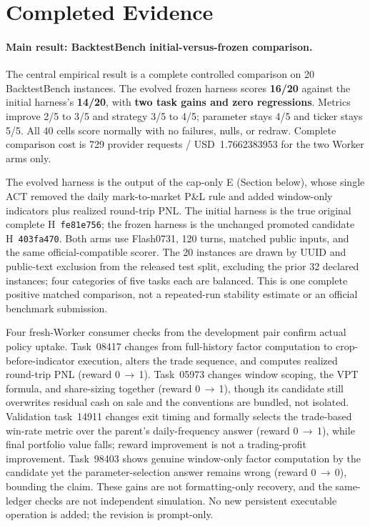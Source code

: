 \section{Completed Evidence}
\label{sec:current-results}

\paragraph{Main result: BacktestBench initial-versus-frozen comparison.}
The central empirical result is a complete controlled comparison on 20
BacktestBench instances.  The evolved frozen harness scores \textbf{16/20}
against the initial harness's \textbf{14/20}, with \textbf{two task gains
and zero regressions}.  Metrics improve 2/5 to 3/5 and strategy 3/5 to 4/5;
parameter stays 4/5 and ticker stays 5/5.  All 40 cells score normally with
no failures, nulls, or redraw.  Complete comparison cost is 729 provider
requests / USD~1.7662383953 for the two Worker arms only.

The evolved harness is the output of the cap-only E (Section below), whose
single ACT removed the daily mark-to-market P\&L rule and added window-only
indicators plus realized round-trip PNL.  The initial harness is the true
original complete H~\texttt{fe81e756}; the frozen harness is the unchanged
promoted candidate H~\texttt{403fa470}.  Both arms use Flash0731, 120 turns,
matched public inputs, and the same official-compatible scorer.  The 20
instances are drawn by UUID and public-text exclusion from the released test
split, excluding the prior 32 declared instances; four categories of five
tasks each are balanced.  This is one complete positive matched comparison,
not a repeated-run stability estimate or an official benchmark submission.

Four fresh-Worker consumer checks from the development pair confirm actual
policy uptake.  Task~08417 changes from full-history factor computation to
crop-before-indicator execution, alters the trade sequence, and computes
realized round-trip PNL (reward 0\,$\to$\,1).  Task~05973 changes window
scoping, the VPT formula, and share-sizing together (reward 0\,$\to$\,1),
though its candidate still overwrites residual cash on sale and the
conventions are bundled, not isolated.  Validation task~14911 changes
exit timing and formally selects the trade-based win-rate metric over the
parent's daily-frequency answer (reward 0\,$\to$\,1), while final portfolio
value falls; reward improvement is not a trading-profit improvement.
Task~98403 shows genuine window-only factor computation by the candidate yet
the parameter-selection answer remains wrong (reward 0\,$\to$\,0), bounding
the claim.  These gains are not formatting-only recovery, and the same-ledger
checks are not independent simulation.  No new persistent executable
operation is added; the revision is prompt-only.



